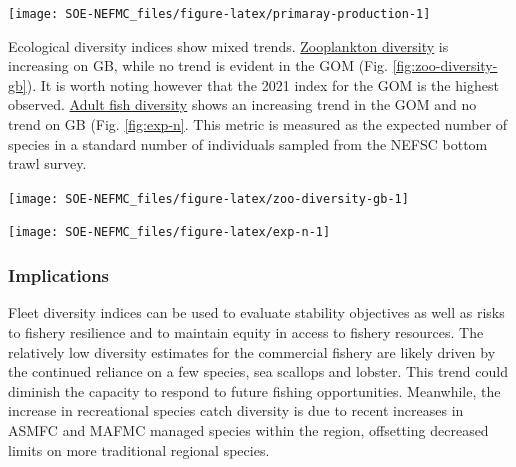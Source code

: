 \documentclass[
  10pt,
]{article}
\let\origfigure\figure
\let\endorigfigure\endfigure
\renewenvironment{figure}[1][2] {
    \expandafter\origfigure\expandafter[H]
} {
    \endorigfigure
}
\begin{document}
\begin{figure}

{\centering \texttt{[image: SOE-NEFMC\_files/figure-latex/primaray-production-1]} 

}

\caption{Total areal annual primary production by ecological production unit. The dashed line represents the long-term (1998-2023) annual mean.}\label{fig:primaray-production}
\end{figure}

Ecological diversity indices show mixed trends. \href{https://noaa-edab.github.io/catalog/zooplankton-diversity.html}{Zooplankton diversity} is increasing on GB, while no trend is evident in the GOM (Fig. \ref{fig:zoo-diversity-gb}). It is worth noting however that the 2021 index for the GOM is the highest observed. \href{https://noaa-edab.github.io/catalog/expected-number-of-species.html}{Adult fish diversity} shows an increasing trend in the GOM and no trend on GB (Fig. \ref{fig:exp-n}. This metric is measured as the expected number of species in a standard number of individuals sampled from the NEFSC bottom trawl survey.

\begin{figure}

{\centering \texttt{[image: SOE-NEFMC\_files/figure-latex/zoo-diversity-gb-1]} 

}

\caption{Zooplankton diversity on Georges Bank and in the Gulf of Maine, based on Shannon diversity index. 2020 surveys were incomplete due to COVID-19.}\label{fig:zoo-diversity-gb}
\end{figure}
\begin{figure}

{\centering \texttt{[image: SOE-NEFMC\_files/figure-latex/exp-n-1]} 

}

\caption{Adult fish diversity for Georges Bank and in the Gulf of Maine, based on expected number of species. Results from survey vessels Albatross and Bigelow are reported separately due to catchability differences.}\label{fig:exp-n}
\end{figure}

\hypertarget{implications-3}{%
\subsubsection{Implications}\label{implications-3}}

Fleet diversity indices can be used to evaluate stability objectives as well as risks to fishery resilience and to maintain equity in access to fishery resources. The relatively low diversity estimates for the commercial fishery are likely driven by the continued reliance on a few species, sea scallops and lobster. This trend could diminish the capacity to respond to future fishing opportunities. Meanwhile, the increase in recreational species catch diversity is due to recent increases in ASMFC and MAFMC managed species within the region, offsetting decreased limits on more traditional regional species.
\end{document}
